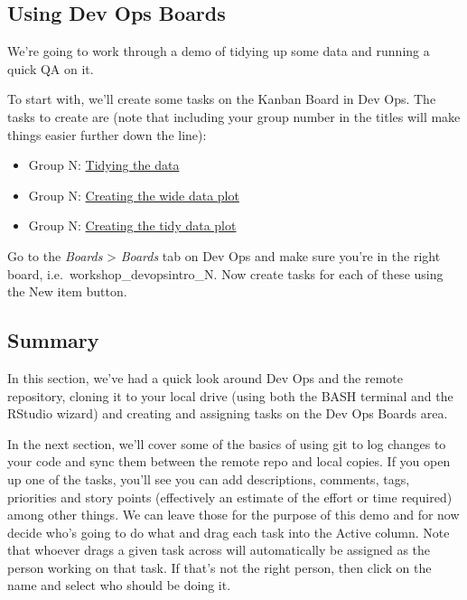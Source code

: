 \documentclass[
  12pt,
]{article}
\providecommand{\tightlist}{%
  \setlength{\itemsep}{0pt}\setlength{\parskip}{0pt}}
\begin{document}
\hypertarget{using-dev-ops-boards}{%
\subsection{Using Dev Ops Boards}\label{using-dev-ops-boards}}

We're going to work through a demo of tidying up some data and running a
quick QA on it.

To start with, we'll create some tasks on the Kanban Board in Dev Ops.
The tasks to create are (note that including your group number in the
titles will make things easier further down the line):

\begin{itemize}
\tightlist
\item
  Group N: \protect\hyperlink{tidying-the-data}{Tidying the data}
\item
  Group N: \protect\hyperlink{creating-the-wide-data-plot}{Creating the
  wide data plot}
\item
  Group N: \protect\hyperlink{creating-the-tidy-data-plot}{Creating the
  tidy data plot}
\end{itemize}

Go to the \emph{Boards} \textgreater{} \emph{Boards} tab on Dev Ops and
make sure you're in the right board, i.e.~workshop\_devopsintro\_N. Now
create tasks for each of these using the New item button.

\hypertarget{summary}{%
\subsection{Summary}\label{summary}}

In this section, we've had a quick look around Dev Ops and the remote
repository, cloning it to your local drive (using both the BASH terminal
and the RStudio wizard) and creating and assigning tasks on the Dev Ops
Boards area.

In the next section, we'll cover some of the basics of using git to log
changes to your code and sync them between the remote repo and local
copies. If you open up one of the tasks, you'll see you can add
descriptions, comments, tags, priorities and story points (effectively
an estimate of the effort or time required) among other things. We can
leave those for the purpose of this demo and for now decide who's going
to do what and drag each task into the Active column. Note that whoever
drags a given task across will automatically be assigned as the person
working on that task. If that's not the right person, then click on the
name and select who should be doing it.
\end{document}
